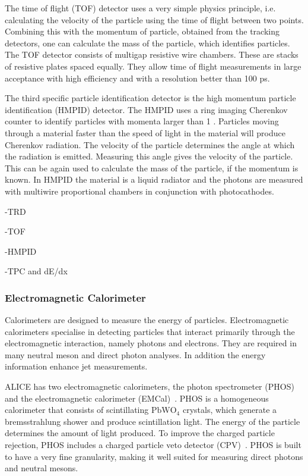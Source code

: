 The time of flight  (TOF) detector uses a very simple physics principle, i.e. calculating the velocity of the particle using the time of flight between two points. Combining this with the momentum of particle, obtained from the tracking detectors, one can calculate the mass of the particle, which identifies particles. The TOF detector consists of multigap resistive wire chambers. These are stacks of resistive plates spaced equally. They allow time of flight measurements in large acceptance with high efficiency and with a resolution better than 100 ps. 

The third specific particle identification detector is the high momentum particle identification (HMPID) detector. The HMPID uses a ring imaging Cherenkov counter to identify particles with momenta larger than 1 \gev. Particles moving through a material faster than the speed of light in the material will produce Cherenkov radiation. The velocity of the particle determines the angle at which the radiation is emitted. Measuring this angle gives the velocity of the particle. This can be again used to calculate the mass of the particle, if the momentum is known. In HMPID the material is a liquid radiator and the photons are measured with multiwire proportional chambers in conjunction with photocathodes. 

-TRD

-TOF

-HMPID

-TPC and dE/dx


\subsubsection{Electromagnetic Calorimeter}
Calorimeters are designed to measure the energy of particles. Electromagnetic calorimeters specialise in detecting particles that interact primarily through the electromagnetic interaction, namely photons and electrons. They are required in many neutral meson and direct photon analyses. In addition the energy information enhance jet measurements.

ALICE has two electromagnetic calorimeters, the photon spectrometer (PHOS)~\cite{phos} and the electromagnetic calorimeter (EMCal)~\cite{emcal}. PHOS is a homogeneous calorimeter that consists of scintillating $\mathrm{PbWO_4}$ crystals, which generate a bremsstrahlung  shower and produce scintillation light. The energy of the particle determines the amount of light produced. To improve the charged particle rejection, PHOS includes a charged particle veto detector (CPV)~\cite{cpv}. PHOS is built to have a very fine granularity, making it well suited for measuring direct photons and neutral mesons.

